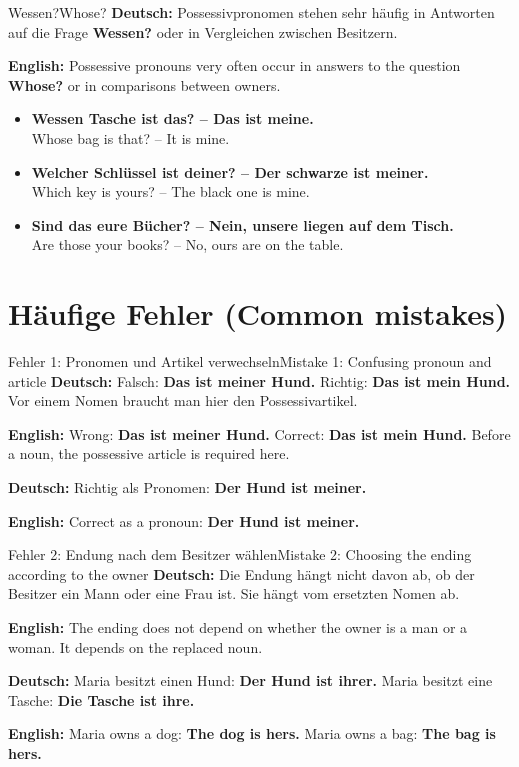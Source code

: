 \documentclass[a4paper,11pt]{article}
\newcommand{\GermanText}[1]{\textbf{Deutsch: }#1\par}
\newcommand{\EnglishText}[1]{{\small\color{SoftGray}\textbf{English: }#1\par}}
\newcommand{\ExampleItem}[2]{\item \textbf{#1}\\{\small\color{SoftGray}#2}}
\begin{document}
        \begin{grammarentry}{Wessen?}{Whose?}
            \GermanText{Possessivpronomen stehen sehr häufig in Antworten auf die Frage \textbf{Wessen?} oder in Vergleichen zwischen Besitzern.}
            \EnglishText{Possessive pronouns very often occur in answers to the question \textbf{Whose?} or in comparisons between owners.}
        \end{grammarentry}

        \begin{exbox}
            \begin{itemize}
                \ExampleItem{Wessen Tasche ist das? -- Das ist meine.}{Whose bag is that? -- It is mine.}
                \ExampleItem{Welcher Schlüssel ist deiner? -- Der schwarze ist meiner.}{Which key is yours? -- The black one is mine.}
                \ExampleItem{Sind das eure Bücher? -- Nein, unsere liegen auf dem Tisch.}{Are those your books? -- No, ours are on the table.}
            \end{itemize}
        \end{exbox}

    \section{Häufige Fehler \textnormal{(Common mistakes)}}

        \begin{grammarentry}{Fehler 1: Pronomen und Artikel verwechseln}{Mistake 1: Confusing pronoun and article}
            \GermanText{Falsch: \textbf{Das ist meiner Hund.} Richtig: \textbf{Das ist mein Hund.} Vor einem Nomen braucht man hier den Possessivartikel.}
            \EnglishText{Wrong: \textbf{Das ist meiner Hund.} Correct: \textbf{Das ist mein Hund.} Before a noun, the possessive article is required here.}

            \GermanText{Richtig als Pronomen: \textbf{Der Hund ist meiner.}}
            \EnglishText{Correct as a pronoun: \textbf{Der Hund ist meiner.}}
        \end{grammarentry}

        \begin{grammarentry}{Fehler 2: Endung nach dem Besitzer wählen}{Mistake 2: Choosing the ending according to the owner}
            \GermanText{Die Endung hängt nicht davon ab, ob der Besitzer ein Mann oder eine Frau ist. Sie hängt vom ersetzten Nomen ab.}
            \EnglishText{The ending does not depend on whether the owner is a man or a woman. It depends on the replaced noun.}

            \GermanText{Maria besitzt einen Hund: \textbf{Der Hund ist ihrer.} Maria besitzt eine Tasche: \textbf{Die Tasche ist ihre.}}
            \EnglishText{Maria owns a dog: \textbf{The dog is hers.} Maria owns a bag: \textbf{The bag is hers.}}
        \end{grammarentry}
\end{document}
